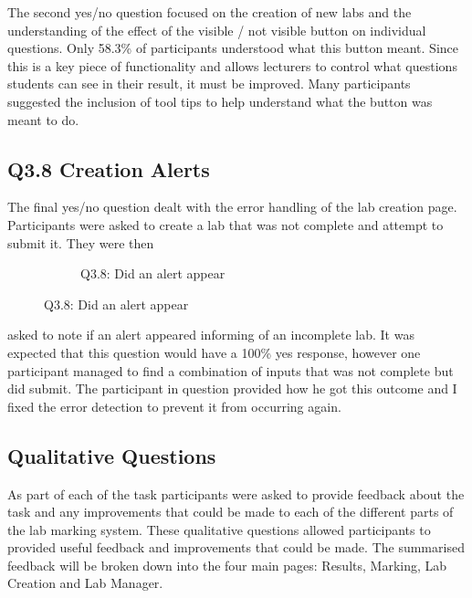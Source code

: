 \documentclass[11pt]{report}
\begin{document}
The second yes/no question focused on the creation of new labs and the understanding of the effect of the visible / not visible button on individual questions. Only 58.3\% of participants understood what this button meant. Since this is a key piece of functionality and allows lecturers to control what questions students can see in their result, it must be improved. Many participants suggested the inclusion of tool tips to help understand what the button was meant to do. 


\subsection*{Q3.8 Creation Alerts}



The final yes/no question dealt with the error handling of the lab creation page. Participants were asked to create a lab that was not complete and attempt to submit it. They were then

\begin{figure}
\vspace*{-\baselineskip}
\begin{figure}[H]
\caption{Q3.8: Did an alert appear}


\end{figure}
\end{figure}

\noindent asked to note if an alert appeared informing of an incomplete lab. It was expected that this question would have a 100\% yes response, however one participant managed to find a combination of inputs that was not complete but did submit. The participant in question provided how he got this outcome and I fixed the error detection to prevent it from occurring again.


\subsection{Qualitative Questions}

As part of each of the task participants were asked to provide feedback about the task and any improvements that could be made to each of the different parts of the lab marking system. These qualitative questions allowed participants to provided useful feedback and improvements that could be made. The summarised feedback will be broken down into the four main pages: Results, Marking, Lab Creation and Lab Manager.
\end{document}
